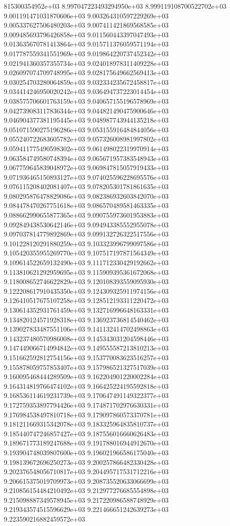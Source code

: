 815300354952e+03	8.997047223493294950e+03	8.999119108700522702e+03	9.001191471031870606e+03	9.003264310597229269e+03	9.005337627506480203e+03	9.007411421869568585e+03	9.009485693796426858e+03	9.011560443397047493e+03	9.013635670781413864e+03	9.015711376059571194e+03	9.017787559341551969e+03	9.019864220737452342e+03	9.021941360357355734e+03	9.024018978311409228e+03	9.026097074709748995e+03	9.028175649662569413e+03	9.030254703280064859e+03	9.032334235672458817e+03	9.034414246950020242e+03	9.036494737223014454e+03	9.038575706601763159e+03	9.040657155196578969e+03	9.042739083117836344e+03	9.044821490475900646e+03	9.046904377381195445e+03	9.048987743944135218e+03	9.051071590275196286e+03	9.053155916484844056e+03	9.055240722683605782e+03	9.057326008981997802e+03	9.059411775490598302e+03	9.061498022319970914e+03	9.063584749580748394e+03	9.065671957383548943e+03	9.067759645839048972e+03	9.069847815057919433e+03	9.071936465150893127e+03	9.074025596228695576e+03	9.076115208402081407e+03	9.078205301781861635e+03	9.080295876478829086e+03	9.082386932603842070e+03	9.084478470267751618e+03	9.086570489581463335e+03	9.088662990655877365e+03	9.090755973601953883e+03	9.092849438530642146e+03	9.094943385552955078e+03	9.097037814779892869e+03	9.099132726322517556e+03	9.101228120291880259e+03	9.103323996799097586e+03	9.105420355955269770e+03	9.107517197871564349e+03	9.109614522659132490e+03	9.111712330429192662e+03	9.113810621292959695e+03	9.115909395361672068e+03	9.118008652746622829e+03	9.120108393559095930e+03	9.122208617910435350e+03	9.124309325911974156e+03	9.126410517675107258e+03	9.128512193311220472e+03	9.130614352931761459e+03	9.132716996648163331e+03	9.134820124571928318e+03	9.136923736814540462e+03	9.139027833487551106e+03	9.141132414702498863e+03	9.143237480570986008e+03	9.145343031204598446e+03	9.147449066714994842e+03	9.149555587213810213e+03	9.151662592812754156e+03	9.153770083623516257e+03	9.155878059757853407e+03	9.157986521327517039e+03	9.160095468444289509e+03	9.162204901220002284e+03	9.164314819766474102e+03	9.166425224195592818e+03	9.168536114619231739e+03	9.170647491149322377e+03	9.172759353897794426e+03	9.174871702976630331e+03	9.176984538497810718e+03	9.179097860573370781e+03	9.181211669315342078e+03	9.183325964835810737e+03	9.185440747246857427e+03	9.187556016660626483e+03	9.189671773189247688e+03	9.191788016944912670e+03	9.193904748039807600e+03	9.196021966586175040e+03	9.198139672696250273e+03	9.200257866482330428e+03	9.202376548056710817e+03	9.204495717531712216e+03	9.206615375019709973e+03	9.208735520633066699e+03	9.210856154484210492e+03	9.212977276685554898e+03	9.215098887349578945e+03	9.217220986588748929e+03	9.219343574515596629e+03	9.221466651242639273e+03	9.223590216882459572e+03
